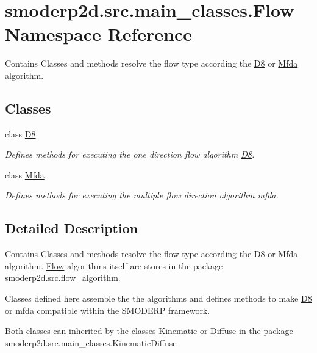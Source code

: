 \hypertarget{namespacesmoderp2d_1_1src_1_1main__classes_1_1Flow}{\section{smoderp2d.\-src.\-main\-\_\-classes.\-Flow Namespace Reference}
\label{namespacesmoderp2d_1_1src_1_1main__classes_1_1Flow}
}


Contains Classes and methods resolve the flow type according the \hyperlink{classsmoderp2d_1_1src_1_1main__classes_1_1Flow_1_1D8}{D8} or \hyperlink{classsmoderp2d_1_1src_1_1main__classes_1_1Flow_1_1Mfda}{Mfda} algorithm.  


\subsection*{Classes}
\begin{DoxyCompactItemize}
\item 
class \hyperlink{classsmoderp2d_1_1src_1_1main__classes_1_1Flow_1_1D8}{D8}
\begin{DoxyCompactList}\small\item\em Defines methods for executing the one direction flow algorithm \hyperlink{classsmoderp2d_1_1src_1_1main__classes_1_1Flow_1_1D8}{D8}. \end{DoxyCompactList}\item 
class \hyperlink{classsmoderp2d_1_1src_1_1main__classes_1_1Flow_1_1Mfda}{Mfda}
\begin{DoxyCompactList}\small\item\em Defines methods for executing the multiple flow direction algorithm mfda. \end{DoxyCompactList}\end{DoxyCompactItemize}


\subsection{Detailed Description}
Contains Classes and methods resolve the flow type according the \hyperlink{classsmoderp2d_1_1src_1_1main__classes_1_1Flow_1_1D8}{D8} or \hyperlink{classsmoderp2d_1_1src_1_1main__classes_1_1Flow_1_1Mfda}{Mfda} algorithm. \hyperlink{namespacesmoderp2d_1_1src_1_1main__classes_1_1Flow}{Flow} algorithms itself are stores in the package smoderp2d.\-src.\-flow\-\_\-algorithm.

Classes defined here assemble the the algorithms and defines methods to make \hyperlink{classsmoderp2d_1_1src_1_1main__classes_1_1Flow_1_1D8}{D8} or mfda compatible within the S\-M\-O\-D\-E\-R\-P framework.

Both classes can inherited by the classes Kinematic or Diffuse in the package smoderp2d.\-src.\-main\-\_\-classes.\-Kinematic\-Diffuse 